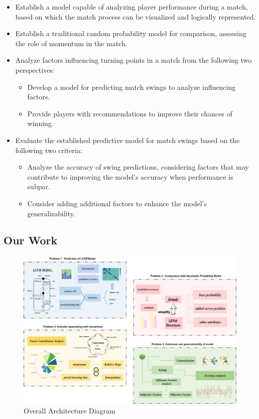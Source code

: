 \begin{itemize}[label=$\bullet$]
  \item Establish a model capable of analyzing player performance during a match, based on which the match process can be visualized and logically represented.
  \item Establish a traditional random probability model for comparison, assessing the role of momentum in the match.
  \item Analyze factors influencing turning points in a match from the following two perspectives:
    \begin{itemize}[label=\textbullet, itemsep=1ex]
       \item Develop a model for predicting match swings to analyze influencing factors.
       \item Provide players with recommendations to improve their chances of winning.
     \end{itemize}
 \item Evaluate the established predictive model for match swings based on the following two criteria:
    \begin{itemize}[label=\textbullet, itemsep=1ex]
       \item Analyze the accuracy of swing predictions, considering factors that may contribute to improving the model's accuracy when performance is subpar.
       \item Consider adding additional factors to enhance the model's generalizability.
    \end{itemize} 

\end{itemize}

\subsection{Our Work}

\begin{figure}[h]
    \centering
    \includegraphics[width=1\textwidth]{figure/3.png}
    \caption{Overall Architecture Diagram}
\end{figure}

